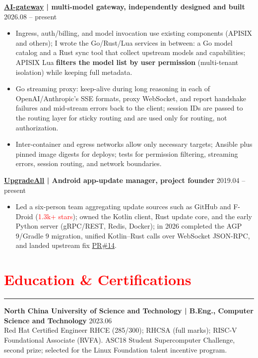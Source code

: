 \documentclass[10pt,a4paper]{article}
\begin{document}
\textbf{\href{https://github.com/xz-dev/AI-gateway}{AI-gateway} | multi-model gateway, independently designed and built} \hfill 2026.08 -- present
\begin{itemize}
	\item Ingress, auth/billing, and model invocation use existing components (APISIX and others); I wrote the Go/Rust/Lua services in between: a Go model catalog and a Rust sync tool that collect upstream models and capabilities; APISIX Lua \textbf{filters the model list by user permission} (multi-tenant isolation) while keeping full metadata.
	\item Go streaming proxy: keep-alive during long reasoning in each of OpenAI/Anthropic's SSE formats, proxy WebSocket, and report handshake failures and mid-stream errors back to the client; session IDs are passed to the routing layer for sticky routing and are used only for routing, not authorization.
	\item Inter-container and egress networks allow only necessary targets; Ansible plus pinned image digests for deploys; tests for permission filtering, streaming errors, session routing, and network boundaries.
\end{itemize}

\textbf{\href{https://github.com/DUpdateSystem/UpgradeAll}{UpgradeAll} | Android app-update manager, project founder} \hfill 2019.04 -- present
\begin{itemize}
	\item Led a six-person team aggregating update sources such as GitHub and F-Droid (\textcolor{red}{1.3k+ stars}); owned the Kotlin client, Rust update core, and the early Python server (gRPC/REST, Redis, Docker); in 2026 completed the AGP 9/Gradle 9 migration, unified Kotlin--Rust calls over WebSocket JSON-RPC, and landed upstream fix \href{https://github.com/MatrixDev/GradleAndroidRustPlugin/pull/14}{PR\#14}.
\end{itemize}

\section*{\textcolor{red}{Education \& Certifications}}
\vspace*{-4ex}
\noindent\textcolor{red}{\rule{\linewidth}{0.4pt}}
\textbf{North China University of Science and Technology | B.Eng., Computer Science and Technology} \hfill 2023.06\\
Red Hat Certified Engineer RHCE (285/300); RHCSA (full marks); RISC-V Foundational Associate (RVFA). ASC18 Student Supercomputer Challenge, second prize; selected for the Linux Foundation talent incentive program.
\end{document}
